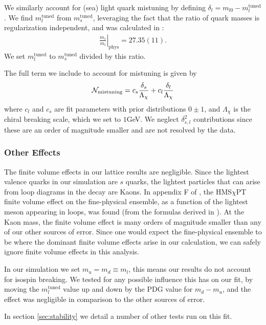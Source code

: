 We similarly account for (sea) light quark mistuning by defining $\delta_l = m_{l0} - m_l^{\text{tuned}}$. We find $m_l^{\text{tuned}}$ from $m_s^{\text{tuned}}$, leveraging the fact that the ratio of quark masses is regularization independent, and was calculated in \cite{Bazavov:2014wgs}:
\begin{align}
  \left.\frac{m_s}{m_l}\right\rvert_{\textrm{phys}} = 27.35(11).
\end{align}
We set $m_l^{\text{tuned}}$ to $m_s^{\text{tuned}}$ divided by this ratio.

The full term we include to account for mistuning is given by
\begin{align}
  \mathcal{N}_{\text{mistuning}} = c_s {\delta_s\over \Lambda_{\chi}} + c_l {\delta_l\over \Lambda_{\chi}}
  \label{eq:mistuning}
\end{align}
where $c_l$ and $c_s$ are fit parameters with prior distributions $0\pm 1$, and $\Lambda_{\chi}$ is the chiral breaking scale, which we set to $1$GeV. We neglect $\delta_{s,l}^2$ contributions since these are an order of magnitude smaller and are not resolved by the data.

\subsubsection{Other Effects}

The finite volume effects in our lattice results are negligible. Since the lightest valence quarks in our simulation are $s$ quarks, the lightest particles that can arise from loop diagrams in the decay are Kaons. In appendix F of \cite{Harrison:2017fmw}, the HMS$\chi$PT finite volume effect on the fine-physical ensemble, as a function of the lightest meson appearing in loops, was found (from the formulas derived in \cite{Laiho:2005ue}). At the Kaon mass, the finite volume effect is many orders of magnitude smaller than any of our other sources of error. Since one would expect the fine-physical ensemble to be where the dominant finite volume effects arise in our calculation, we can safely ignore finite volume effects in this analysis.

In our simulation we set $m_u=m_d\equiv m_l$, this means our results do not account for isospin breaking. We tested for any possible influence this has on our fit, by moving the $m_l^{\text{tuned}}$ value up and down by the PDG value for $m_d-m_u$, and the effect was negligible in comparison to the other sources of error.

In section \ref{sec:stability} we detail a number of other tests run on this fit.

